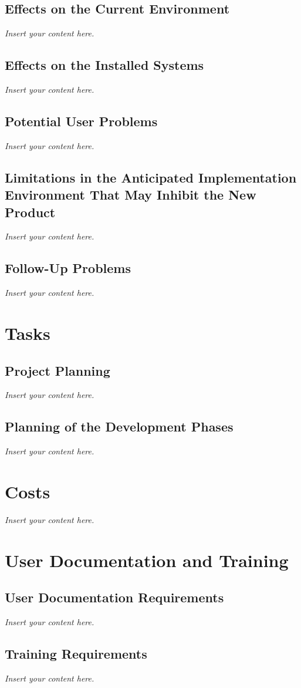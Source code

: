 \documentclass[12pt]{article}
\newcommand{\lips}{\textit{Insert your content here.}}
\begin{document}
\subsection{Effects on the Current Environment}
\lips
\subsection{Effects on the Installed Systems}
\lips
\subsection{Potential User Problems}
\lips
\subsection{Limitations in the Anticipated Implementation Environment That May
Inhibit the New Product}
\lips
\subsection{Follow-Up Problems}
\lips

\section{Tasks}
\subsection{Project Planning}
\lips
\subsection{Planning of the Development Phases}
\lips

\section{Costs}
\lips
\section{User Documentation and Training}
\subsection{User Documentation Requirements}
\lips
\subsection{Training Requirements}
\lips
\end{document}
